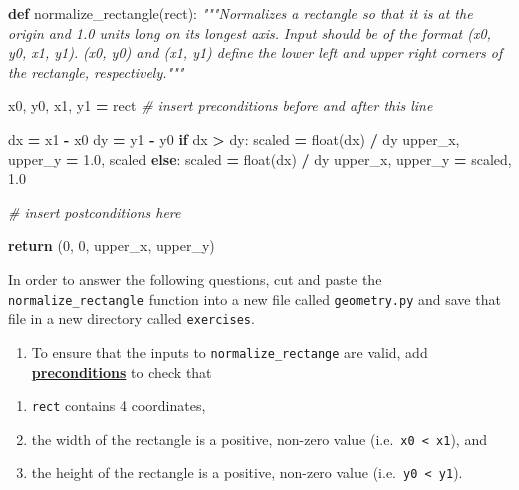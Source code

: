 \documentclass[
]{krantz}
\makeatletter
\newenvironment{Shaded}{\begin{snugshade}}{\end{snugshade}}
\newcommand{\BuiltInTok}[1]{#1}
\newcommand{\CommentTok}[1]{\textcolor[rgb]{0.56,0.35,0.01}{\textit{#1}}}
\newcommand{\ControlFlowTok}[1]{\textcolor[rgb]{0.13,0.29,0.53}{\textbf{#1}}}
\newcommand{\DecValTok}[1]{\textcolor[rgb]{0.00,0.00,0.81}{#1}}
\newcommand{\FloatTok}[1]{\textcolor[rgb]{0.00,0.00,0.81}{#1}}
\newcommand{\KeywordTok}[1]{\textcolor[rgb]{0.13,0.29,0.53}{\textbf{#1}}}
\newcommand{\NormalTok}[1]{#1}
\newcommand{\OperatorTok}[1]{\textcolor[rgb]{0.81,0.36,0.00}{\textbf{#1}}}
\providecommand{\tightlist}{%
  \setlength{\itemsep}{0pt}\setlength{\parskip}{0pt}}
\newenvironment{kframe}{%
\medskip{}
\setlength{\fboxsep}{.8em}
 \def\at@end@of@kframe{}%
 \ifinner\ifhmode%
  \def\at@end@of@kframe{\end{minipage}}%
  \begin{minipage}{\columnwidth}%
 \fi\fi%
 \def\FrameCommand##1{\hskip\@totalleftmargin \hskip-\fboxsep
 \colorbox{shadecolor}{##1}\hskip-\fboxsep
     \hskip-\linewidth \hskip-\@totalleftmargin \hskip\columnwidth}%
 \MakeFramed {\advance\hsize-\width
   \@totalleftmargin\z@ \linewidth\hsize
   \@setminipage}}%
 {\par\unskip\endMakeFramed%
 \at@end@of@kframe}
\renewenvironment{Shaded}{\begin{kframe}}{\end{kframe}}
\newcommand{\gref}[2]{\hyperlink{#2}{\textbf{#1}}}
\makeatother
\begin{document}
\begin{Shaded}
\begin{Highlighting}[]
\KeywordTok{def}\NormalTok{ normalize\_rectangle(rect):}
    \CommentTok{"""Normalizes a rectangle so that it is at the origin}
\CommentTok{    and 1.0 units long on its longest axis.}
\CommentTok{    Input should be of the format (x0, y0, x1, y1).}
\CommentTok{    (x0, y0) and (x1, y1) define the lower left and}
\CommentTok{    upper right corners of the rectangle, respectively."""}
    
\NormalTok{    x0, y0, x1, y1 }\OperatorTok{=}\NormalTok{ rect  }\CommentTok{\# insert preconditions before and after this line }
    
\NormalTok{    dx }\OperatorTok{=}\NormalTok{ x1 }\OperatorTok{{-}}\NormalTok{ x0}
\NormalTok{    dy }\OperatorTok{=}\NormalTok{ y1 }\OperatorTok{{-}}\NormalTok{ y0}
    \ControlFlowTok{if}\NormalTok{ dx }\OperatorTok{\textgreater{}}\NormalTok{ dy:}
\NormalTok{        scaled }\OperatorTok{=} \BuiltInTok{float}\NormalTok{(dx) }\OperatorTok{/}\NormalTok{ dy}
\NormalTok{        upper\_x, upper\_y }\OperatorTok{=} \FloatTok{1.0}\NormalTok{, scaled}
    \ControlFlowTok{else}\NormalTok{:}
\NormalTok{        scaled }\OperatorTok{=} \BuiltInTok{float}\NormalTok{(dx) }\OperatorTok{/}\NormalTok{ dy}
\NormalTok{        upper\_x, upper\_y }\OperatorTok{=}\NormalTok{ scaled, }\FloatTok{1.0}

    \CommentTok{\# insert postconditions here}

    \ControlFlowTok{return}\NormalTok{ (}\DecValTok{0}\NormalTok{, }\DecValTok{0}\NormalTok{, upper\_x, upper\_y)}
\end{Highlighting}
\end{Shaded}

In order to answer the following questions,
cut and paste the \texttt{normalize\_rectangle} function into a new file called \texttt{geometry.py} and
save that file in a new directory called \texttt{exercises}.

\begin{enumerate}
\def\labelenumi{\arabic{enumi}.}
\tightlist
\item
  To ensure that the inputs to \texttt{normalize\_rectange} are valid,
  add \gref{preconditions}{precondition} to check that
\end{enumerate}

\begin{enumerate}
\def\labelenumi{(\alph{enumi})}
\tightlist
\item
  \texttt{rect} contains 4 coordinates,
\item
  the width of the rectangle is a positive, non-zero value (i.e.~\texttt{x0\ \textless{}\ x1}), and
\item
  the height of the rectangle is a positive, non-zero value (i.e.~\texttt{y0\ \textless{}\ y1}).
\end{enumerate}
\end{document}
